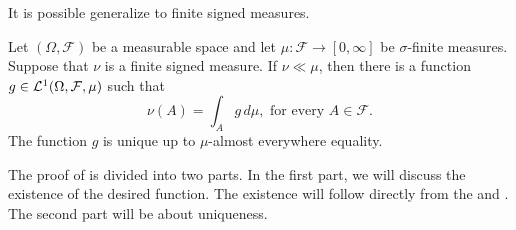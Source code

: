 It is possible generalize  to finite signed measures.
\begin{theorem}
\label{thm:radon-nikodym-signed}
Let $(\Omega, \mathcal{F})$ be a measurable space and let $\mu : \mathcal{F} \to [0, \infty]$ be $\sigma$-finite measures. Suppose that $\nu$ is a finite signed measure. If $\nu \ll \mu$, then there is a function $g \in {\mathcal {L}^1}(\Omega, \mathcal{F}, \mu)$ such that 
\begin{equation*}
    \nu(A) = \int_{A} g  \,d\mu, \text{ for every $A \in \mathcal{F}$}.
\end{equation*}
The function $g$ is unique up to $\mu$-almost everywhere equality.
\end{theorem}
\begin{proof-idea*}
The proof of  is divided into two parts. In the first part, we will discuss the existence of the desired function. The existence will follow directly from the  and . The second part will be about uniqueness.
\end{proof-idea*}
